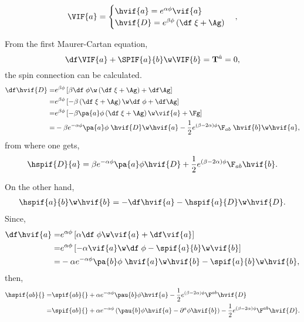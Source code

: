 \begin{equation}
\VIF{a} = 
\begin{cases}
  \hvif{a} = e^{\alpha\phi} \vif{a}\\
  \hvif{D} = e^{\beta\phi}\left(\df\;\xi +\Ag \right)
\end{cases},
\end{equation}

From the first Maurer-Cartan equation,
\begin{equation}
  \df\VIF{a} + \SPIF{a}{b}\w\VIF{b} = {\bf{T}}^{\hat{a}} = 0,
\end{equation}
the spin connection can be calculated.
\begin{align}
  \df\hvif{D} =& e^{\beta\phi}\left[\beta\df\;\phi\w\left(\df\;\xi +\Ag \right) + \df\Ag\right]\nonumber\\
  =& e^{\beta\phi}\left[-\beta\left(\df\;\xi +\Ag \right)\w\df\;\phi + \df\Ag\right]\nonumber\\
  =& e^{\beta\phi}\left[-\beta\pa{a}\phi\left(\df\;\xi +\Ag \right)\w\vif{a} + \Fg\right]\nonumber\\
 =& -\beta e^{-\alpha\phi}\pa{a}\phi\;\hvif{D}\w\hvif{a} -\frac{1}{2}e^{(\beta-2\alpha)\phi}\F_{a b}\;\hvif{b}\w\hvif{a},
\end{align}
from where one gets,
\begin{align}
  \hspif{D}{a} = \beta e^{-\alpha\phi}\pa{a}\phi\hvif{D} + \frac{1}{2}e^{(\beta-2\alpha)\phi}\F_{a b}\hvif{b}.
\end{align}

On the other hand,
\begin{align}
  \hspif{a}{b}\w\hvif{b} = -\df\hvif{a} - \hspif{a}{D}\w\hvif{D}.
\end{align}
Since,
\begin{align}
  \df\hvif{a} 
  =& e^{\alpha\phi}\left[\alpha\df\;\phi\w\vif{a} +  \df\vif{a}\right]\nonumber\\
  =& e^{\alpha\phi}\left[-\alpha\vif{a}\w\df\;\phi -  \spif{a}{b}\w\vif{b}\right]\nonumber\\
  =& -\alpha e^{-\alpha\phi}\pa{b}\phi\;\hvif{a}\w\hvif{b} - \spif{a}{b}\w\hvif{b},
\end{align}
then,
\begin{align}
  \hspif{ab}{} =& \spif{ab}{} + \alpha e^{-\alpha\phi}\pau{b}\phi\hvif{a} - \frac{1}{2}e^{(\beta-2\alpha)\phi}\F^{a b}\hvif{D}\nonumber\\
  =& \spif{ab}{} + \alpha e^{-\alpha\phi}\left(\pau{b}\phi\hvif{a} - \partial^{a}\phi\hvif{b}\right) - \frac{1}{2}e^{(\beta-2\alpha)\phi}\F^{a b}\hvif{D}.
\end{align}

